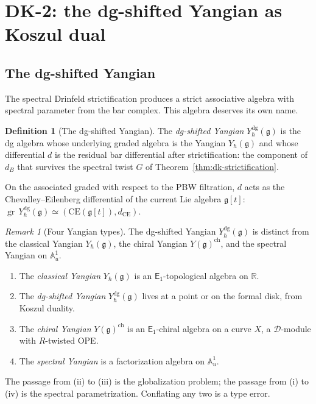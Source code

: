 \documentclass[11pt,reqno]{amsart}
\theoremstyle{definition}
\newtheorem{definition}[theorem]{Definition}
\theoremstyle{remark}
\newtheorem{remark}[theorem]{Remark}
\newcommand{\cD}{\mathcal{D}}
\newcommand{\Eone}{\mathsf{E}_{1}}
\DeclareMathOperator{\gr}{gr}
\newcommand{\fg}{\mathfrak{g}}
\newcommand{\Ydg}{Y^{\mathrm{dg}}}
\newcommand{\RR}{\mathbb{R}}
\numberwithin{equation}{section}
\begin{document}
\section{DK-2: the dg-shifted Yangian as Koszul dual}
\label{sec:dk2}

\subsection{The dg-shifted Yangian}

The spectral Drinfeld strictification produces a strict
associative algebra with spectral parameter from the bar
complex.  This algebra deserves its own name.

\begin{definition}[The dg-shifted Yangian]
\label{def:dk-dg-yangian}
The \emph{dg-shifted Yangian} $\Ydg_\hbar(\fg)$ is the
dg algebra whose underlying graded algebra is the Yangian
$Y_\hbar(\fg)$ and whose differential $d$ is the residual
bar differential after strictification: the component of
$d_B$ that survives the spectral twist $G$ of
Theorem~\ref{thm:dk-strictification}.

On the associated graded with respect to the PBW filtration,
$d$ acts as the Chevalley--Eilenberg differential of the
current Lie algebra $\fg[t]$:
$\gr\,\Ydg_\hbar(\fg) \simeq (\mathrm{CE}(\fg[t]), d_{\mathrm{CE}})$.
\end{definition}

\begin{remark}[Four Yangian types]
\label{rem:dk-four-yangians}
The dg-shifted Yangian $\Ydg_\hbar(\fg)$ is distinct from
the classical Yangian $Y_\hbar(\fg)$, the chiral Yangian
$Y(\fg)^{\mathrm{ch}}$, and the spectral Yangian on
$\mathbb{A}^1_u$.
\begin{enumerate}[label=(\roman*)]
\item The \emph{classical Yangian} $Y_\hbar(\fg)$ is an
  $\Eone$-topological algebra on $\RR$.
\item The \emph{dg-shifted Yangian} $\Ydg_\hbar(\fg)$
  lives at a point or on the formal disk, from Koszul
  duality.
\item The \emph{chiral Yangian} $Y(\fg)^{\mathrm{ch}}$
  is an $\Eone$-chiral algebra on a curve $X$, a
  $\cD$-module with $R$-twisted OPE.
\item The \emph{spectral Yangian} is a factorization
  algebra on $\mathbb{A}^1_u$.
\end{enumerate}
The passage from (ii) to (iii) is the globalization problem;
the passage from (i) to (iv) is the spectral
parametrization.  Conflating any two is a type error.
\end{remark}
\end{document}
